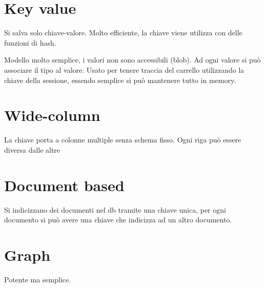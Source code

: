 \section{Key value}
Si salva solo chiave-valore. Molto efficiente, la chiave viene utilizza con delle 
funzioni di hash.

Modello molto semplice, i valori non sono accessibili (blob). Ad ogni valore si 
può associare il tipo al valore. Usato per tenere traccia del carrello utilizzando 
la chiave della sessione, essendo semplice si può mantenere tutto in memory.

\section{Wide-column}
La chiave porta a colonne multiple senza schema fisso. Ogni riga può essere 
diversa dalle altre

\section{Document based}
Si indicizzano dei documenti nel db tramite una chiave unica, per ogni documento
si può avere una chiave che indicizza ad un altro documento.
\section{Graph}
Potente ma semplice.

